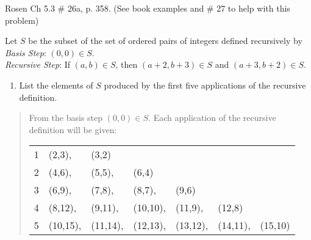 \documentclass[10pt,addpoints]{exam}
\begin{document}
\begin{questions}
\question[6] Rosen Ch 5.3 \# 26a, p. 358. (See book examples and \#
27 to help with this problem)
\begin{solution}
Let $S$ be the subset of the set of ordered pairs of integers defined recursively by \\
\textit{Basis Step}: $(0,0) \in S$. \\
\textit{Recursive Step}: If $(a,b) \in S$, then $(a+2,b+3)\in S$ and $(a+3,b+2) \in S$. \\
\begin{enumerate}
    \item List the elements of $S$ produced by the first five applications of the recursive definition.
\end{enumerate}
\begin{quote}
    From the basis step $(0,0) \in S$.  Each application of the recursive definition will be given:

    \begin{tabular}{rllllll}
    1 & (2,3), & (3,2) \\
    2 & (4,6), & (5,5), & (6,4) \\
    3 & (6,9), & (7,8), & (8,7), & (9,6) \\
    4 & (8,12), & (9,11), & (10,10), & (11,9), & (12,8) \\
    5 & (10,15), & (11,14), & (12,13), & (13,12), & (14,11), & (15,10) \\
    \end{tabular}
\end{quote}
\end{solution}


\end{questions}
\end{document}
